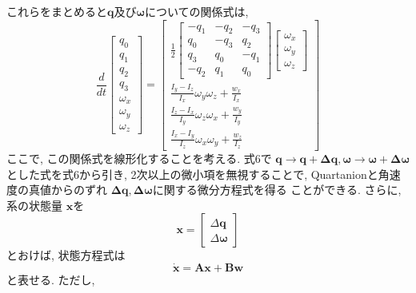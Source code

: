 \documentclass[dvipdfmx, fleqn, uplatex, a4paper]{jsarticle}
\begin{document}
これらをまとめると$\bm{q}$及び$\bm{\omega}$についての関係式は,
\begin{equation}
  \frac{d}{dt}
  \begin{bmatrix}
    q_0 \\
    q_1 \\
    q_2 \\
    q_3 \\
    \omega_x \\
    \omega_y \\
    \omega_z
  \end{bmatrix}
  =
  \begin{bmatrix}
    \frac{1}{2}
    \begin{bmatrix}
      -q_1 & -q_2 & -q_3 \\
      q_0 & -q_3 & q_2 \\
      q_3 & q_0 & -q_1 \\
      -q_2 & q_1 & q_0
    \end{bmatrix}
    \begin{bmatrix}
      \omega_x \\
      \omega_y \\
      \omega_z
    \end{bmatrix} \\
    \displaystyle \frac{I_y - I_z}{I_x}\omega_y\omega_z + \displaystyle \frac{w_x}{I_x} \\
    \displaystyle \frac{I_z - I_x}{I_y}\omega_z\omega_x + \displaystyle \frac{w_y}{I_y} \\
    \displaystyle \frac{I_x - I_y}{I_z}\omega_x\omega_y + \displaystyle \frac{w_z}{I_z}
  \end{bmatrix}
\end{equation}
ここで, この関係式を線形化することを考える. 式6で
$\bm{q} \to \bm{q} + \bm{\Delta q}, \bm{\omega} \to \bm{\omega} + \bm{\Delta \omega}$
とした式を式6から引き, 2次以上の微小項を無視することで,
Quartanionと角速度の真値からのずれ $\bm{\Delta q}, \bm{\Delta \omega}$に関する微分方程式を得る
ことができる.
さらに, 系の状態量 $\bm{x}$を
\begin{equation}
  \bm{x} =
  \begin{bmatrix}
    \Delta \bm{q} \\
    \Delta \bm{\omega}
  \end{bmatrix}
\end{equation}
とおけば, 状態方程式は
\begin{equation}
  \dot{\bm{x}} = \bm{A}\bm{x} + \bm{B}\bm{w}
\end{equation}
と表せる. ただし,
\end{document}

